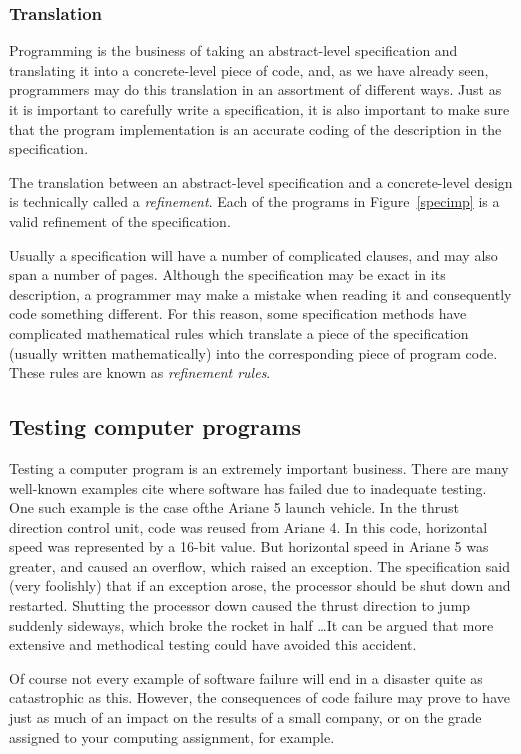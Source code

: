 \subsubsection{Translation}

Programming is the business of taking an abstract-level specification
and translating it into a concrete-level piece of code, and, as we
have already seen,  programmers may 
do this translation in an assortment of different ways. 
Just as it is important to carefully write a specification, it is also 
important to make sure that the program implementation is an accurate
coding of the description in the specification.


The translation between an abstract-level specification and a concrete-level
design is technically called a {\em refinement}. Each of the programs
in Figure~\ref{specimp} is a valid refinement of the specification.


Usually a specification will have a number of complicated clauses, and 
may also span a number of pages. Although the specification 
may be exact in its description, a programmer may make a mistake 
when reading it and consequently code something different. For this 
reason, some specification methods have complicated mathematical rules 
which translate a piece of the specification (usually written mathematically)
into the corresponding piece of program code. These rules are 
known as {\em refinement rules}. 

\subsection{Testing computer programs}

Testing a computer program is an extremely important business. There are many
well-known examples cite where software has failed due to inadequate testing.
One such example is the case ofthe  Ariane 5 launch vehicle.
In the thrust direction control unit, 
code was reused from Ariane 4.
In this code, horizontal speed was represented
by a 16-bit value.
But horizontal speed in Ariane 5 was greater,
and caused an overflow, which raised an exception.
The specification said (very foolishly) that
if an exception arose, the processor should be 
shut down and restarted.
Shutting the processor down caused the thrust
direction to jump suddenly sideways, which
broke the rocket in half \ldots It can be argued that more extensive
and methodical testing could have avoided this accident.


Of course not every example of software failure will end in a disaster 
quite as catastrophic as this. However, the consequences of  code failure
may prove to have just as much of an impact on the results of a small company,
or on the grade assigned to your computing assignment, for example.

